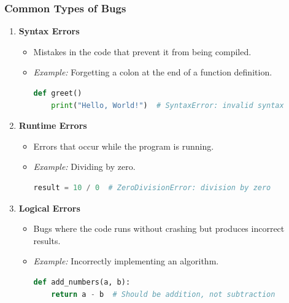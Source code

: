 \documentclass{beamer}
\begin{document}
\begin{frame}[fragile]
    \frametitle{Common Types of Bugs}
    \begin{enumerate}
        \item \textbf{Syntax Errors}
        \begin{itemize}
            \item Mistakes in the code that prevent it from being compiled.
            \item \textit{Example:} Forgetting a colon at the end of a function definition.
            \begin{lstlisting}[language=Python]
def greet()
    print("Hello, World!")  # SyntaxError: invalid syntax
            \end{lstlisting}
        \end{itemize}
        
        \item \textbf{Runtime Errors}
        \begin{itemize}
            \item Errors that occur while the program is running.
            \item \textit{Example:} Dividing by zero.
            \begin{lstlisting}[language=Python]
result = 10 / 0  # ZeroDivisionError: division by zero
            \end{lstlisting}
        \end{itemize}
        
        \item \textbf{Logical Errors}
        \begin{itemize}
            \item Bugs where the code runs without crashing but produces incorrect results.
            \item \textit{Example:} Incorrectly implementing an algorithm.
            \begin{lstlisting}[language=Python]
def add_numbers(a, b):
    return a - b  # Should be addition, not subtraction
            \end{lstlisting}
        \end{itemize}
    \end{enumerate}  
\end{frame}
\end{document}

